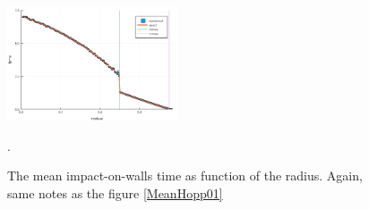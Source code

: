 \documentclass[superscriptaddress,pre,reprint,showpacs,onecolumn]{revtex4-1}
\begin{document}
\begin{figure}[h]
  \centering
  \includegraphics[width=0.45\textwidth]{./figures/HitRightWall01.png}
  \caption{The mean impact-on-walls time as function of the radius. Again, same
    notes as the figure \ref{MeanHopp01}}\label{MeanImp01}.
\end{figure}

\end{document}
